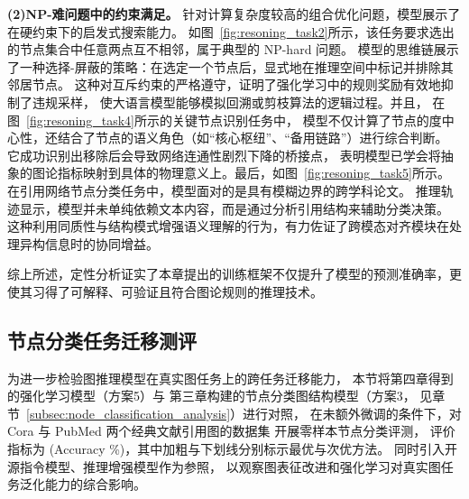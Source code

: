 \textbf{(2)NP-难问题中的约束满足。}
针对计算复杂度较高的组合优化问题，模型展示了在硬约束下的{启发式搜索能力}。
如图~\ref{fig:resoning_task2}所示，该任务要求选出的节点集合中任意两点互不相邻，属于典型的 NP-hard 问题。
模型的思维链展示了一种选择-屏蔽的策略：在选定一个节点后，显式地在推理空间中标记并排除其邻居节点。
这种对互斥约束的严格遵守，证明了强化学习中的规则奖励有效地抑制了违规采样，
使大语言模型能够模拟回溯或剪枝算法的逻辑过程。并且，
在图~\ref{fig:resoning_task4}所示的关键节点识别任务中，
模型不仅计算了节点的度中心性，还结合了节点的语义角色（如“核心枢纽”、“备用链路”）进行综合判断。
它成功识别出移除后会导致网络连通性剧烈下降的桥接点，
表明模型已学会将抽象的图论指标映射到具体的物理意义上。最后，如图~\ref{fig:resoning_task5}所示。
在引用网络节点分类任务中，模型面对的是具有模糊边界的跨学科论文。
推理轨迹显示，模型并未单纯依赖文本内容，而是通过分析引用结构来辅助分类决策。
这种利用同质性与结构模式增强语义理解的行为，有力佐证了跨模态对齐模块在处理异构信息时的协同增益。

综上所述，定性分析证实了本章提出的训练框架不仅提升了模型的预测准确率，更使其习得了可解释、可验证且符合图论规则的推理技术。



\subsection{节点分类任务迁移测评}

为进一步检验图推理模型在真实图任务上的跨任务迁移能力，
本节将第四章得到的强化学习模型（方案5）与
第三章构建的节点分类图结构模型（方案3，
见章节~\ref{subsec:node_classification_analysis}）进行对照，
在未额外微调的条件下，对 Cora 与 PubMed 两个经典文献引用图的数据集
开展零样本节点分类评测，
评价指标为 (Accuracy \%)，其中加粗与下划线分别标示最优与次优方法。
同时引入开源指令模型、推理增强模型作为参照，
以观察图表征改进和强化学习对真实图任务泛化能力的综合影响。

\begin{table}[htbp]
  \centering
  \caption{强化学习微调的图结构大模型在节点分类任务上零样本性能对比}
  \label{tab:real_world_generalization}
\end{table}


